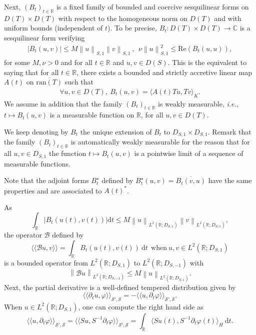 \documentclass[11pt, letterpaper]{amsart}
\theoremstyle{definition}
\theoremstyle{remark}
\newcommand{\llangle}{\langle\!\langle}
\newcommand{\rrangle}{\rangle\!\rangle}
\numberwithin{equation}{section}
\begin{document}
{Next, $(B_t)_{t\in \mathbb{R}}$ is a fixed family of bounded and coercive sesquilinear forms on $D(T)\times D(T)$ {with respect to the homogeneous norm on $D(T)$} and with uniform bounds (independent of $t$). To be precise, $B_t : D(T) \times D(T) \rightarrow \mathbb{C}$ is a sesquilinear form verifying 
\begin{align}\label{EllipticityAbstract}
   \left | B_t(u,v) \right |\leq M \left \| u \right \|_{S,1}\left \| v \right \|_{S,1}\ ,\ \  \nu \left \| u \right \|_{S,1}^2 \leq \mathrm{Re} (B_t(u,u)),
\end{align}
for some $ M, \nu >0$ and for all $t \in \mathbb{R}$ and $u,v \in D(S)$. This is the equivalent to saying that for all $t \in \mathbb{R}$, there exists a bounded and strictly accretive linear map  $A(t)$ on $ \overline{\mathrm{ran}(T)}$ such that
\begin{align}\label{eq:TstarAT}
    \forall u,v \in D(T),\ B_t(u,v)=\langle A(t) Tu, Tv \rangle_K.
\end{align}
We assume in addition that the family $(B_t)_{t\in \mathbb{R}}$ is weakly measurable, \textit{i.e.}, $t \mapsto B_t(u,v)$ is a measurable function on $\mathbb{R}$, for all $u,v \in D(T)$. 

We keep denoting by $B_t$ the unique extension of $B_t$ to $D_{S,1}\times D_{S,1}$. Remark that the family $(B_t)_{t\in \mathbb{R}}$ is automatically weakly measurable for the reason that for all $u,v \in D_{S,1}$ the function $t \mapsto B_t(u,v)$ is a pointwise limit of a sequence of measurable functions. 

Note that the adjoint forms $B_t^\star$ defined by $B_t^\star(u,v)=\overline{B_t(v,u)}$ have the same properties and are associated to $A(t)^*$.

As
\begin{equation*}
       \int_\mathbb{R}\left |   B_t(u(t),v(t)) \right |\mathrm dt \leq M \left \| u \right \|_{L^2(\mathbb{R};D_{S,1})} \left \| v \right \|_{L^2(\mathbb{R};D_{S,1})},
\end{equation*}
the operator $\mathcal{B}$ defined by $$\llangle \mathcal{B}u, v \rrangle = \int_{\mathbb{R}} B_t(u(t),v(t))  \ \mathrm{d}t \ \ \mathrm{when} \  u,v \in L^2(\mathbb{R};D_{S,1})$$ is a bounded operator from $L^2(\mathbb{R};D_{S,1})$ to $L^2(\mathbb{R};D_{S,-1})$ with
\begin{equation*}
        \left \| \mathcal{B}u \right \|_{L^2(\mathbb{R};D_{S,-1})} \leq M \left \| u \right \|_{L^2(\mathbb{R};D_{S,1})}.
\end{equation*}
Next, the partial derivative is a well-defined tempered distribution given by 
   $$
   \llangle \partial_t u  , \varphi \rrangle_{\mathcal{S}',\mathcal{S}}= -\llangle  u, \partial_t\varphi \rrangle_{\mathcal{S}',\mathcal{S}}.
   $$
   When $u\in L^2(\mathbb{R};D_{S,1})$, one can compute the right hand side as 
   $$\llangle  u, \partial_t\varphi \rrangle_{\mathcal{S}',\mathcal{S}}= \llangle  Su, S^{-1}\partial_t\varphi \rrangle_{\mathcal{S}',\mathcal{S}}= \int_{\mathbb{R}}  \langle Su(t), S^{-1}\partial_t \varphi(t) \rangle_{H} \ \mathrm{d}t.
   $$
   
}
\end{document}
